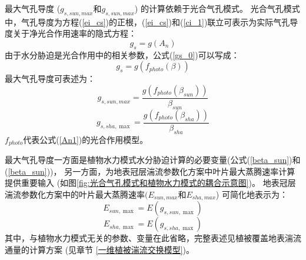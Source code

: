 最大气孔导度 ($g_{s,sun,max}$和$g_{s,sun,max}$) 的计算依赖于光合气孔模式。
光合气孔模式中，气孔导度为方程(\ref{ei_cs})的正根，(\ref{ei_cs})和(\ref{ci_1})联立可表示为实际气孔导度关于净光合作用速率的隐式方程：
\begin{equation}\label{gs_0}
g_{s}=g\left(A_{n}\right)
\end{equation}
由于水分胁迫是光合作用中的相关参数，公式(\ref{gs_0})可以写成：
\begin{equation}\label{gs_1}
g_{s}=g\left(f_{photo}(\beta)\right)
\end{equation}
最大气孔导度可表述为：
\begin{equation}\label{gs_sunmax}
g_{s,  { sun,max }}=\frac{g\left(f_{ {photo }}\left(\beta_{ {sun }}\right)\right)}{\beta_{ {sun }}}
\end{equation}
\begin{equation}\label{gs_shamax}
g_{s, sha, \max }=\frac{g\left(f_{photo}\left(\beta_{s h a}\right)\right)}{\beta_{s h a}}
\end{equation}
$f_{photo}$代表公式(\ref{An1})的光合作用模型。


最大气孔导度一方面是植物水力模式水分胁迫计算的必要变量(公式(\ref{beta_sun})和(\ref{beta_sun}))，
另一方面，为地表冠层湍流参数化方案中叶片最大蒸腾速率计算提供重要输入 (如图\ref{fig:光合气孔模式和植物水力模式的耦合示意图})。
地表冠层湍流参数化方案中的叶片最大蒸腾速率$(E_{sun,max}$和$E_{sha,max}$) 可简化地表示为：
\begin{equation}\label{E_sunmax}
E_{sun, \max }=E\left(g_{s, sun, \max }\right)
\end{equation}
\begin{equation}\label{E_shamax}
E_{sha, \max }=E\left(g_{s, sha, \max }\right)
\end{equation}
其中，与植物水力模式无关的参数、变量在此省略，完整表述见植被覆盖地表湍流通量的计算方案 (见章节 \ref{一维植被湍流交换模型})。


